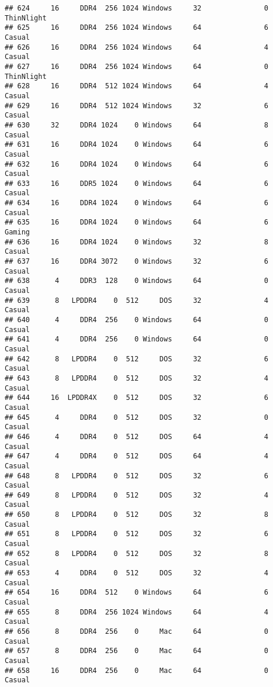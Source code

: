 \documentclass[
]{article}
\begin{document}
\begin{verbatim}
## 624     16     DDR4  256 1024 Windows     32               0 ThinNlight
## 625     16     DDR4  256 1024 Windows     64               6     Casual
## 626     16     DDR4  256 1024 Windows     64               4     Casual
## 627     16     DDR4  256 1024 Windows     64               0 ThinNlight
## 628     16     DDR4  512 1024 Windows     64               4     Casual
## 629     16     DDR4  512 1024 Windows     32               6     Casual
## 630     32     DDR4 1024    0 Windows     64               8     Casual
## 631     16     DDR4 1024    0 Windows     64               6     Casual
## 632     16     DDR4 1024    0 Windows     64               6     Casual
## 633     16     DDR5 1024    0 Windows     64               6     Casual
## 634     16     DDR4 1024    0 Windows     64               6     Casual
## 635     16     DDR4 1024    0 Windows     64               6     Gaming
## 636     16     DDR4 1024    0 Windows     32               8     Casual
## 637     16     DDR4 3072    0 Windows     32               6     Casual
## 638      4     DDR3  128    0 Windows     64               0     Casual
## 639      8   LPDDR4    0  512     DOS     32               4     Casual
## 640      4     DDR4  256    0 Windows     64               0     Casual
## 641      4     DDR4  256    0 Windows     64               0     Casual
## 642      8   LPDDR4    0  512     DOS     32               6     Casual
## 643      8   LPDDR4    0  512     DOS     32               4     Casual
## 644     16  LPDDR4X    0  512     DOS     32               6     Casual
## 645      4     DDR4    0  512     DOS     32               0     Casual
## 646      4     DDR4    0  512     DOS     64               4     Casual
## 647      4     DDR4    0  512     DOS     64               4     Casual
## 648      8   LPDDR4    0  512     DOS     32               6     Casual
## 649      8   LPDDR4    0  512     DOS     32               4     Casual
## 650      8   LPDDR4    0  512     DOS     32               8     Casual
## 651      8   LPDDR4    0  512     DOS     32               6     Casual
## 652      8   LPDDR4    0  512     DOS     32               8     Casual
## 653      4     DDR4    0  512     DOS     32               4     Casual
## 654     16     DDR4  512    0 Windows     64               6     Casual
## 655      8     DDR4  256 1024 Windows     64               4     Casual
## 656      8     DDR4  256    0     Mac     64               0     Casual
## 657      8     DDR4  256    0     Mac     64               0     Casual
## 658     16     DDR4  256    0     Mac     64               0     Casual

\end{verbatim}
\end{document}
